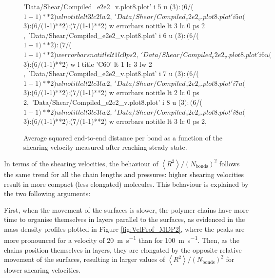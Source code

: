 \documentclass[aps,prb,reprint,superscriptaddress, a4paper]{revtex4-1}
\begin{document}
\begin{figure}
\begin{center}
\begin{gnuplot}[terminal=pdf, terminaloptions={size \SERFigwidth cm, \SERFigheight cm color solid}]
				'Data/Shear/Compiled_e2e2_v.plot8.plot' i 5 u ($3):($6/($1-1)**2) w l notitle lt 3 lc 2 lw 2 ,\
				'Data/Shear/Compiled_e2e2_v.plot8.plot' i 5 u ($3):($6/($1-1)**2):($7/($1-1)**2) w errorbars notitle lt 3 lc 0 ps 2 ,\
				'Data/Shear/Compiled_e2e2_v.plot8.plot' i 6 u ($3):($6/($1-1)**2):($7/($1-1)**2) w errorbars notitle lt 1 lc 0 ps 2 ,\
				'Data/Shear/Compiled_e2e2_v.plot8.plot' i 6 u ($3):($6/($1-1)**2) w l title 'C60' lt 1 lc 3 lw 2 ,\				
				'Data/Shear/Compiled_e2e2_v.plot8.plot' i 7 u ($3):($6/($1-1)**2) w l notitle  lt 2 lc 3 lw 2 ,\
				'Data/Shear/Compiled_e2e2_v.plot8.plot' i 7 u ($3):($6/($1-1)**2):($7/($1-1)**2) w errorbars notitle  lt 2 lc 0 ps 2,\
				'Data/Shear/Compiled_e2e2_v.plot8.plot' i 8 u ($3):($6/($1-1)**2) w l notitle  lt 3 lc 3 lw 2 ,\
				'Data/Shear/Compiled_e2e2_v.plot8.plot' i 8 u ($3):($6/($1-1)**2):($7/($1-1)**2) w errorbars notitle  lt 3 lc 0 ps 2,\
		\end{gnuplot}
		\caption{Average squared end-to-end distance per bond as a function of the shearing velocity measured after reaching steady state.}
		\label{fig:e2e2_v}
	\end{center}
 \end{figure}

In terms of the shearing velocities, the behaviour of $\left< R^2 \right>/\left(N_\text{bonds}\right)^2$ follows the same trend for all the chain lengths and pressures: higher shearing velocities result in more compact (less elongated) molecules. This behaviour is explained by the two following arguments:

First,  when the movement of the surfaces is slower, the  polymer chains have more time to organise themselves in layers parallel to the surfaces, as evidenced in the mass density profiles plotted in Figure \ref{fig:VelProf_MDP2}, where the peaks are more pronounced for  a velocity of \SI{20}{\meter\per\second} than for \SI{100}{\meter\per\second}. Then, as the chains position themselves in layers, they are  elongated by the opposite relative movement of the surfaces, resulting in larger values of $\left< R^2 \right>/\left(N_\text{bonds}\right)^2$ for slower shearing velocities.
\end{document}
